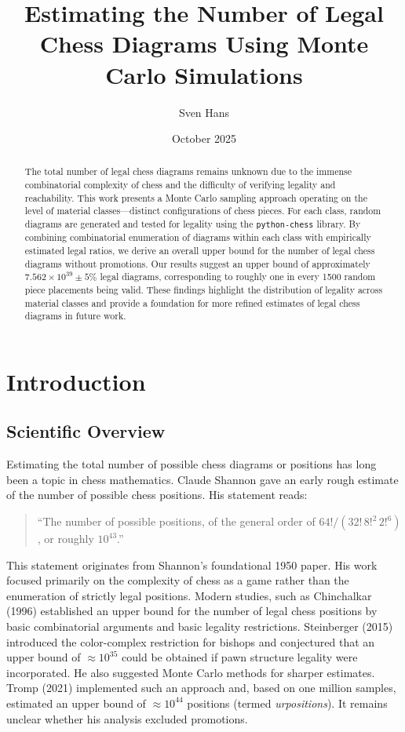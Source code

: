 \documentclass[12pt]{article}
\title{Estimating the Number of Legal Chess Diagrams Using Monte Carlo Simulations}
\author{Sven Hans}
\date{October 2025}
\begin{document}
\maketitle

\begin{abstract}
The total number of legal chess diagrams remains unknown due to the immense
combinatorial complexity of chess and the difficulty of verifying legality and reachability. 
This work presents a Monte Carlo sampling approach operating on the level of 
material classes—distinct configurations of chess pieces. For each class, random 
diagrams are generated and tested for legality using the \texttt{python-chess} library. 
By combining combinatorial enumeration of diagrams within each class with empirically 
estimated legal ratios, we derive an overall upper bound for the number of legal chess diagrams 
without promotions. Our results suggest an upper bound of approximately 
$7.562\times10^{39} \pm 5\%$ legal diagrams, corresponding to roughly one in every 
1500 random piece placements being valid. These findings highlight the distribution 
of legality across material classes and provide a foundation for more refined estimates 
of legal chess diagrams in future work.
\end{abstract}

\section{Introduction}

\subsection{Scientific Overview}

Estimating the total number of possible chess diagrams or positions has long been a topic in chess mathematics. Claude Shannon \cite{shannon1950} gave an early rough estimate of the number of possible chess positions. His statement reads:

\begin{quote}
``The number of possible positions, of the general order of 
$64! / (32! \, 8!^2 \, 2!^6)$, or roughly $10^{43}$.''
\end{quote}

This statement originates from Shannon’s foundational 1950 paper. His work focused primarily on the complexity of chess as a game rather than the enumeration of strictly legal positions. 
Modern studies, such as Chinchalkar (1996) \cite{chinchalkar1996} established an upper bound for the number of legal chess positions by basic combinatorial arguments and basic legality restrictions. Steinberger (2015) \cite{steinerberger2015} 
introduced the color-complex restriction for bishops and conjectured that an 
upper bound of $\approx 10^{35}$ could be obtained if pawn structure legality were 
incorporated. He also suggested Monte Carlo methods for sharper estimates. 
Tromp (2021) \cite{tromp2021b} implemented such an approach and, based on one 
million samples, estimated an upper bound of $\approx 10^{44}$ positions (termed 
\emph{urpositions}). It remains unclear whether his analysis excluded promotions.
\end{document}
